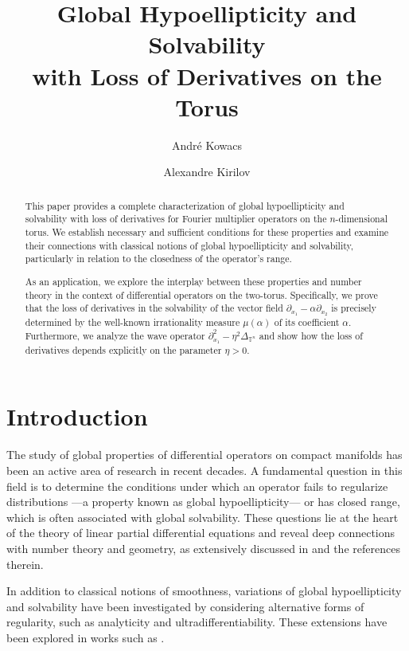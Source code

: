 \documentclass[11pt]{amsart}
\title[Global Hypoellipticity and Solvability]{Global Hypoellipticity and Solvability \\ with Loss of Derivatives on the Torus}
\author{André Kowacs} %
\author{Alexandre Kirilov} %
\numberwithin{equation}{section}
\theoremstyle{definition}
\begin{document}
	\begin{abstract}
		This paper provides a complete characterization of global hypoellipticity and solvability with loss of derivatives for Fourier multiplier operators on the $n$-dimensional torus. We establish necessary and sufficient conditions for these properties and examine their connections with classical notions of global hypoellipticity and solvability, particularly in relation to the closedness of the operator's range.
		
		As an application, we explore the interplay between these properties and number theory in the context of differential operators on the two-torus. Specifically, we prove that the loss of derivatives in the solvability of the vector field $\partial_{x_1} - \alpha \partial_{x_2}$ is precisely determined by the well-known irrationality measure $\mu(\alpha)$ of its coefficient $\alpha$.
		Furthermore, we analyze the wave operator $\partial_{x_1}^2 - \eta^2 \Delta_{\mathbb{T}^n}$ and show how the loss of derivatives depends explicitly on the parameter $\eta > 0$.
	\end{abstract}	


	
\maketitle
 \section{Introduction}
 	
 	The study of global properties of differential operators on compact manifolds has been an active area of research in recent decades. A fundamental question in this field is to  determine the conditions under which an operator fails to regularize distributions —a property known as global hypoellipticity— or has closed range, which is often associated with global solvability. These questions lie at the heart of the theory of linear partial differential equations and reveal deep connections with number theory and geometry, as extensively discussed in
 	\cite{
 		AP2006_ferrara,
 		AFR2022_jam, 
 		Berg1999_tams,
 		CC2000_cpde,
 		Avil2023_mn,
 		Petr2011_tams}  
 	and the references therein.
 	
 	In addition to classical notions of smoothness, variations of global hypoellipticity and solvability have been investigated by considering alternative forms of regularity, such as analyticity and ultradifferentiability. These extensions have been explored in works such as  
 	\cite{
 		AKM2019_jmaa,
 		BDG2018_jde,
 		AM2022_adm,
 		Les2021_afm,
 		Petr2009_mn}.
 	 
\end{document}
